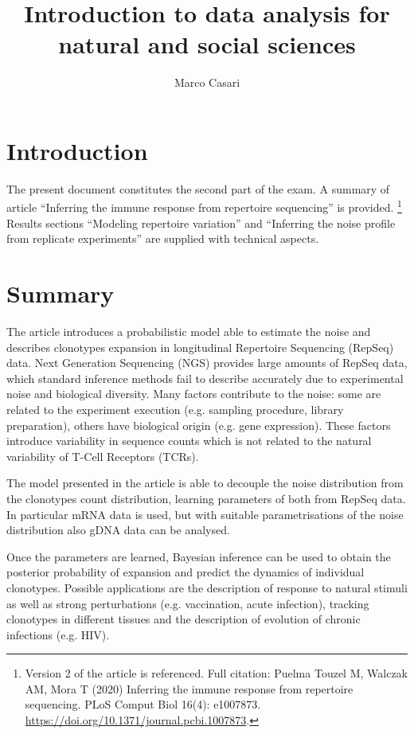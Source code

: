 \documentclass[a4paper,twocolumn]{article}
\title{Introduction to data analysis for natural and social sciences}
\author{Marco Casari}
\date{}
\begin{document}
\maketitle

\section{Introduction}
The present document constitutes the second part of the exam. A summary of article ``Inferring the immune response from repertoire sequencing'' is provided.%
\footnote{Version 2 of the article is referenced. Full citation: Puelma Touzel M, Walczak AM, Mora T (2020) Inferring the immune response from repertoire sequencing. PLoS Comput Biol 16(4): e1007873. \url{https://doi.org/10.1371/journal.pcbi.1007873}.}
Results sections ``Modeling repertoire variation'' and ``Inferring the noise profile from replicate experiments'' are supplied with technical aspects.

\section{Summary}
The article introduces a probabilistic model able to estimate the noise and describes clonotypes expansion in longitudinal Repertoire Sequencing (RepSeq) data.
Next Generation Sequencing (NGS) provides large amounts of RepSeq data, which standard inference methods fail to describe accurately due to experimental noise and biological diversity. Many factors contribute to the noise: some are related to the experiment execution (e.g. sampling procedure, library preparation), others have biological origin (e.g. gene expression). These factors introduce variability in sequence counts which is not related to the natural variability of T-Cell Receptors (TCRs).

The model presented in the article is able to decouple the noise distribution from the clonotypes count distribution, learning parameters of both from RepSeq data. In particular mRNA data is used, but with suitable parametrisations of the noise distribution also gDNA data can be analysed.

Once the parameters are learned, Bayesian inference can be used to obtain the posterior probability of expansion and predict the dynamics of individual clonotypes.
Possible applications are the description of response to natural stimuli as well as strong perturbations (e.g. vaccination, acute infection), tracking clonotypes in different tissues and the description of evolution of chronic infections (e.g. HIV).
\end{document}
